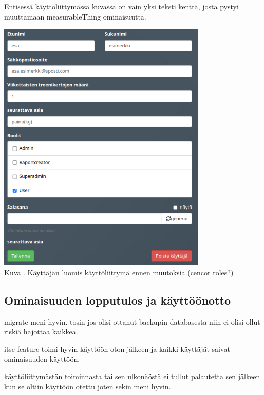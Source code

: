 Entisessä käyttöliittymässä kuvassa \nextImageCount {} on vain yksi teksti kenttä, josta pystyi muuttamaan measurableThing ominaisuutta.
\bigskip


\includegraphics[width = 10cm]{src/public/oppar/adminUserProfilePre.png}\\
Kuva \getImgCount {}. Käyttäjän luomis käyttöliittymä ennen muutoksia (cencor roles?)
\medskip










\subsection{Ominaisuuden lopputulos ja käyttöönotto}


migrate meni hyvin. tosin jos olisi ottanut backupin databasesta niin ei olisi ollut riskiä hajottaa kaikkea.
\medskip

itse feature toimi hyvin käyttöön oton jälkeen ja kaikki käyttäjät saivat ominaisuuden käyttöön.
\medskip

käyttöliittymästän toiminnasta tai sen ulkonäöstä ei tullut palautetta sen jälkeen kun se oltiin käyttöön otettu joten sekin meni hyvin.
\medskip

